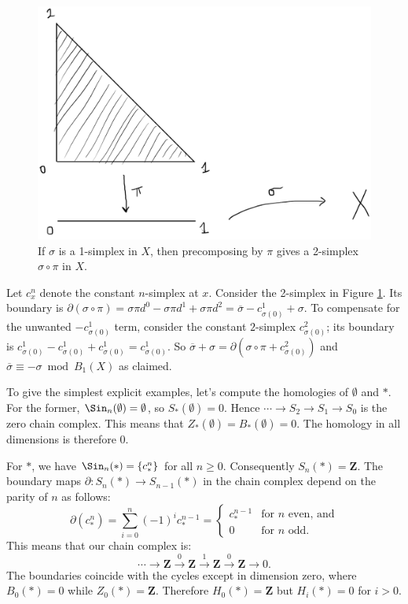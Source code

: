 \begin{figure}
	\centering
	\includegraphics[width=0.6\linewidth]{assets/L02/02-pi-then-sigma}
	\caption{If $\sigma$ is a 1-simplex in $X$, then precomposing by $\pi$ gives a 2-simplex $\sigma \circ \pi$ in $X$.}
	\label{fig:02-pi-then-sigma}
\end{figure}

Let $c^n_{x}$ denote the constant $n$-simplex at $x$. Consider the 2-simplex in Figure \ref{fig:02-pi-then-sigma}. Its boundary is $\partial(\sigma\circ\pi)=\sigma\pi d^0-\sigma\pi d^1 +\sigma\pi d^2=\overline{\sigma}-c^1_{\sigma(0)}+\sigma$. To compensate for the unwanted $-c^1_{\sigma(0)}$ term, consider the constant $2$-simplex $c^2_{\sigma(0)}$; its boundary is $c^1_{\sigma(0)}-c^1_{\sigma(0)}+c^1_{\sigma(0)}=c^1_{\sigma(0)}$. So $\overline{\sigma}+\sigma=\partial(\sigma\circ\pi + c^2_{\sigma(0)})$ and $\overline{\sigma}\equiv -\sigma\bmod B_1(X)$ as claimed.

To give the simplest explicit examples, let's compute the homologies of $\emptyset$ and $\ast$. For the former, $\Sin_n(\emptyset)=\emptyset$, so $S_\ast(\emptyset)=0$. Hence $\cdots\to S_2\to S_1\to S_0$ is the zero chain complex. This means that $Z_\ast(\emptyset)=B_\ast(\emptyset)=0$. The homology in all dimensions is therefore $0$.

For $\ast$, we have $\Sin_n(\ast)=\{c^n_\ast\}$ for all $n\geq 0$. Consequently $S_n(\ast)=\mathbf{Z}$. The boundary maps $\partial\colon S_n(\ast)\to S_{n-1}(\ast)$ in the chain complex depend on the parity of $n$ as follows:
\[\partial(c^n_\ast)=\sum_{i=0}^{n}(-1)^i c^{n-1}_\ast=
\begin{cases}
    c^{n-1}_* & \text{for } n \text{ even, and}\\
    0 & \text{for } n \text{ odd.}
  \end{cases}
\]
This means that our chain complex is:
$$\cdots\to\mathbf{Z}\xrightarrow{0}\mathbf{Z}\xrightarrow{1}\mathbf{Z}\xrightarrow{0}\mathbf{Z}\to 0.$$
The boundaries coincide with the cycles except in dimension zero, where $B_0(\ast)=0$ while $Z_0(\ast)=\mathbf{Z}$. Therefore $ H_0(\ast)=\mathbf{Z}$ but $ H_i(\ast)=0$ for $i>0$.

